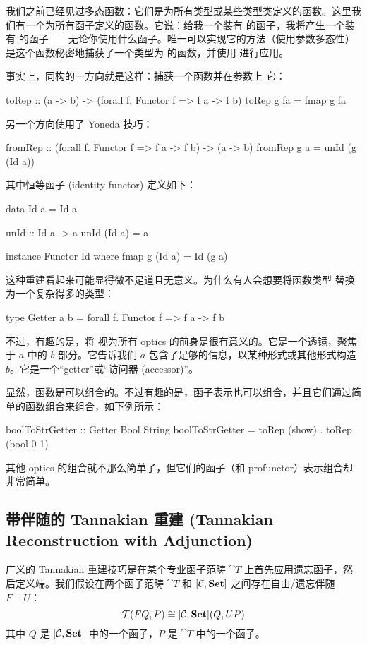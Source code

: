 \documentclass[DaoFP]{subfiles}
\begin{document}
 我们之前已经见过多态函数：它们是为所有类型或某些类型类定义的函数。这里我们有一个为所有函子定义的函数。它说：给我一个装有  的函子，我将产生一个装有  的函子——无论你使用什么函子。唯一可以实现它的方法（使用参数多态性）是这个函数秘密地捕获了一个类型为  的函数，并使用  进行应用。

 事实上，同构的一方向就是这样：捕获一个函数并在参数上  它：
 \begin{haskell}
  toRep :: (a -> b) -> (forall f. Functor f => f a -> f b)
  toRep g fa = fmap g fa
 \end{haskell}
 另一个方向使用了 Yoneda 技巧：
 \begin{haskell}
  fromRep :: (forall f. Functor f => f a -> f b) -> (a -> b)
  fromRep g a = unId (g (Id a))
 \end{haskell}
 其中恒等函子 (identity functor) 定义如下：
 \begin{haskell}
  data Id a = Id a

  unId :: Id a -> a
  unId (Id a) = a

  instance Functor Id where
  fmap g (Id a) = Id (g a)
 \end{haskell}

 这种重建看起来可能显得微不足道且无意义。为什么有人会想要将函数类型  替换为一个复杂得多的类型：
 \begin{haskell}
  type Getter a b = forall f. Functor f => f a -> f b
 \end{haskell}
 不过，有趣的是，将  视为所有 optics 的前身是很有意义的。它是一个透镜，聚焦于 $a$ 中的 $b$ 部分。它告诉我们 $a$ 包含了足够的信息，以某种形式或其他形式构造 $b$。它是一个“getter”或“访问器 (accessor)”。

 显然，函数是可以组合的。不过有趣的是，函子表示也可以组合，并且它们通过简单的函数组合来组合，如下例所示：
 \begin{haskell}
  boolToStrGetter :: Getter Bool String
  boolToStrGetter = toRep (show) . toRep (bool 0 1)
 \end{haskell}
 其他 optics 的组合就不那么简单了，但它们的函子（和 profunctor）表示组合却非常简单。

 \subsection{带伴随的 Tannakian 重建 (Tannakian Reconstruction with Adjunction)}

 广义的 Tannakian 重建技巧是在某个专业函子范畴 $\cat T$ 上首先应用遗忘函子，然后定义端。我们假设在两个函子范畴 $\cat T$ 和 $[\mathcal{C}, \mathbf{Set}]$ 之间存在自由/遗忘伴随 $F \dashv U$：
 \[ \mathcal{T} (F Q, P) \cong  [\mathcal{C}, \mathbf{Set}] ( Q, U P )\]
 其中 $Q$ 是 $[\mathcal{C}, \mathbf{Set}]$ 中的一个函子，$P$ 是 $\cat T$ 中的一个函子。
\end{document}

